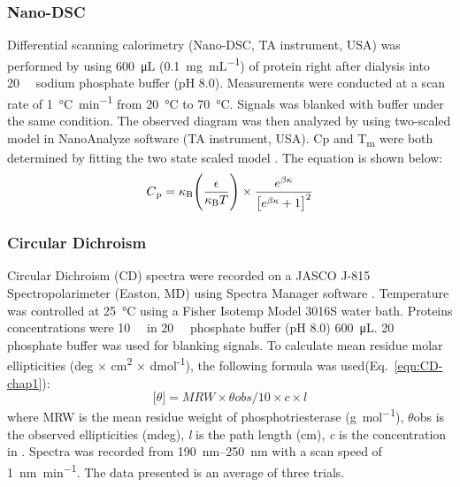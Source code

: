\begin{refsection}
\subsubsection{Nano-DSC}
\label{sec:dsc-method}

Differential scanning calorimetry (Nano-DSC, TA instrument, USA) was performed
by using \SI{600}{\micro\L} (\SI{0.1}{\mg\per\mL}) of protein right after
dialysis into \SI{20}{\milli\Molar} sodium phosphate buffer (pH 8.0).
Measurements were conducted at a scan rate of \SI{1}{\celsius\per\minute} from
\SI{20}{\celsius} to \SI{70}{\celsius}.  Signals was blanked with buffer under
the same condition.  The observed diagram was then analyzed by using
two-scaled model in NanoAnalyze software (TA instrument, USA). Cp and
T\textsubscript{m} were both determined by fitting the two state scaled model
\cite{Privalov1986}. The equation is shown below:
\begin{equation}
    C\textsubscript{p} = \kappa\textsubscript{B}
    \Bigg(\frac{\epsilon}{\kappa\textsubscript{B}T}\Bigg) \times
    \frac{e^{\beta\kappa}}{\big[e^{\beta\kappa}+1\big]^{2}} \label{eqn:dsc}
\end{equation}

\subsubsection{Circular Dichroism}
\label{sec:cd-method}

Circular Dichroism (CD) spectra were recorded on a JASCO J-815 Spectropolarimeter
(Easton, MD) using Spectra Manager software \cite{Kataev1985}. Temperature was
controlled at \SI{25}{\celsius} using a Fisher Isotemp Model 3016S water bath.
Proteins concentrations were \SI{10}{\micro\Molar} in \SI{20}{\milli\Molar}
phosphate buffer (pH 8.0) \SI{600}{\micro\liter}.  \SI{20}{\milli\Molar}
phosphate buffer was used for blanking signals. To calculate mean residue molar
ellipticities (deg $\times$ cm\textsuperscript{2} $\times$
dmol\textsuperscript{-1}), the following formula \cite{Kelly2005} was
used(Eq.~\ref{eqn:CD-chap1}): 
\begin{equation}
    \big[\theta\big] = MRW \times \theta obs / 10 \times c \times l
    \label{eqn:CD-chap1}
\end{equation}
where MRW is the mean residue weight of phosphotriesterase
(\si{\gram\per\mol}), $\theta$obs is the observed ellipticities (mdeg),
\emph{l} is the path length (cm), \emph{c} is the concentration in
\SI{}{\Molar}. Spectra was recorded from \SIrange{190}{250}{\nm} with a scan
speed of \SI{1}{\nano\meter\per\minute}.  The data presented is an average of
three trials.


\end{refsection}
